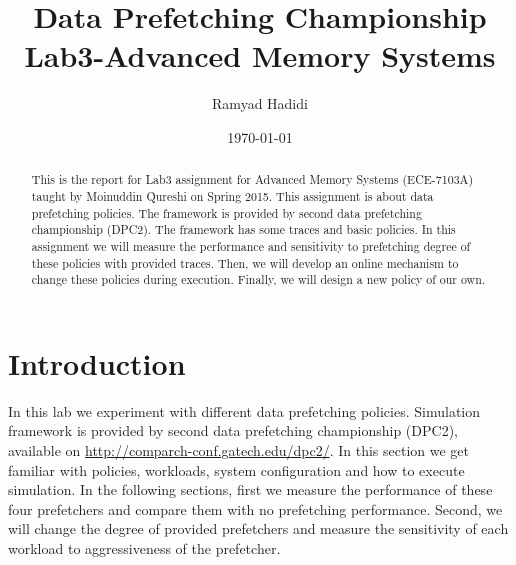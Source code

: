 \documentclass{article}
\title{Data Prefetching Championship\\
        \large{Lab3-Advanced Memory Systems}}
\author{Ramyad Hadidi}
\date{\today}
\begin{document}

\maketitle

\begin{abstract}
This is the report for Lab3 assignment for Advanced Memory Systems (ECE-7103A) taught by Moinuddin Qureshi on Spring 2015. This assignment is about data prefetching policies. The framework is provided by second data prefetching championship (DPC2). The framework has some traces and basic policies. In this assignment we will measure the performance and sensitivity to prefetching degree of these policies with provided traces. Then, we will develop an online mechanism to change these policies during execution. Finally, we will design a new policy of our own. 
\end{abstract}

\section{Introduction}
In this lab we experiment with different data prefetching policies. Simulation framework is provided by second data prefetching championship (DPC2), available on \url{http://comparch-conf.gatech.edu/dpc2/}. In this section we get familiar with policies, workloads, system configuration and how to execute simulation. In the following sections, first we measure the performance of these four prefetchers and compare them with no prefetching performance. Second, we will change the degree of provided prefetchers and measure the sensitivity of each workload to aggressiveness of the prefetcher.
\end{document}
